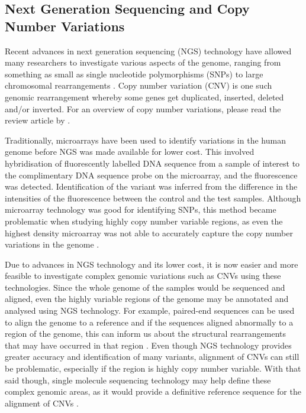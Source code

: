\documentclass[a4paper, 12pt]{article}
\begin{document}
\subsection*{Next Generation Sequencing and Copy Number Variations}

Recent advances in next generation sequencing (NGS) technology have allowed many researchers to investigate various aspects of the genome, ranging from something as small as single nucleotide polymorphisms (SNPs) to large chromosomal rearrangements \citep{Metzker2010}.
Copy number variation (CNV) is one such genomic rearrangement whereby some genes get duplicated, inserted, deleted and/or inverted.
For an overview of copy number variations, please read the review article by \citet{Girirajan2011}.

Traditionally, microarrays have been used to identify variations in the human genome before NGS was made available for lower cost.
This involved hybridisation of fluorescently labelled DNA sequence from a sample of interest to the complimentary DNA sequence probe on the microarray, and the fluorescence was detected.
Identification of the variant was inferred from the difference in the intensities of the fluorescence between the control and the test samples.
Although microarray technology was good for identifying SNPs, this method became problematic when studying highly copy number variable regions, as even the highest density microarray was not able to accurately capture the copy number variations in the genome \citep{Girirajan2011}.

Due to advances in NGS technology and its lower cost, it is now easier and more feasible to investigate complex genomic variations such as CNVs using these technologies.
Since the whole genome of the samples would be sequenced and aligned, even the highly variable regions of the genome may be annotated and analysed using NGS technology.
For example, paired-end sequences can be used to align the genome to a reference and if the sequences aligned abnormally to a region of the genome, this can inform us about the structural rearrangements that may have occurred in that region \citep{Girirajan2011}.
Even though NGS technology provides greater accuracy and identification of many variants, alignment of CNVs can still be problematic, especially if the region is highly copy number variable.
With that said though, single molecule sequencing technology may help define these complex genomic areas, as it would provide a definitive reference sequence for the alignment of CNVs \citep{Rank2009}.
\end{document}
